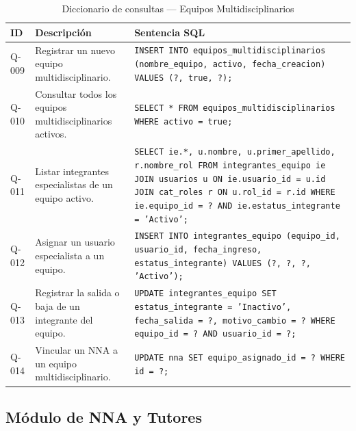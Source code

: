 \begin{table}[H]
	\centering
	\caption{Diccionario de consultas --- Equipos Multidisciplinarios}
	\label{tab:consultas-equipos}
	\footnotesize
	\begin{tabular}{l p{4.5cm} p{8.5cm}}
		\toprule
		\textbf{ID} & \textbf{Descripción} & \textbf{Sentencia SQL} \\
		\midrule
		Q-009 & Registrar un nuevo equipo multidisciplinario. & 
		\texttt{INSERT INTO equipos\_multidisciplinarios (nombre\_equipo, activo, fecha\_creacion) VALUES (?, true, ?);} \\
		\addlinespace
		Q-010 & Consultar todos los equipos multidisciplinarios activos. & 
		\texttt{SELECT * FROM equipos\_multidisciplinarios WHERE activo = true;} \\
		\addlinespace
		Q-011 & Listar integrantes especialistas de un equipo activo. & 
		\texttt{SELECT ie.*, u.nombre, u.primer\_apellido, r.nombre\_rol FROM integrantes\_equipo ie JOIN usuarios u ON ie.usuario\_id = u.id JOIN cat\_roles r ON u.rol\_id = r.id WHERE ie.equipo\_id = ? AND ie.estatus\_integrante = 'Activo';} \\
		\addlinespace
		Q-012 & Asignar un usuario especialista a un equipo. & 
		\texttt{INSERT INTO integrantes\_equipo (equipo\_id, usuario\_id, fecha\_ingreso, estatus\_integrante) VALUES (?, ?, ?, 'Activo');} \\
		\addlinespace
		Q-013 & Registrar la salida o baja de un integrante del equipo. & 
		\texttt{UPDATE integrantes\_equipo SET estatus\_integrante = 'Inactivo', fecha\_salida = ?, motivo\_cambio = ? WHERE equipo\_id = ? AND usuario\_id = ?;} \\
		\addlinespace
		Q-014 & Vincular un NNA a un equipo multidisciplinario. & 
		\texttt{UPDATE nna SET equipo\_asignado\_id = ? WHERE id = ?;} \\
		\bottomrule
	\end{tabular}
\end{table}

\subsection{Módulo de NNA y Tutores}

